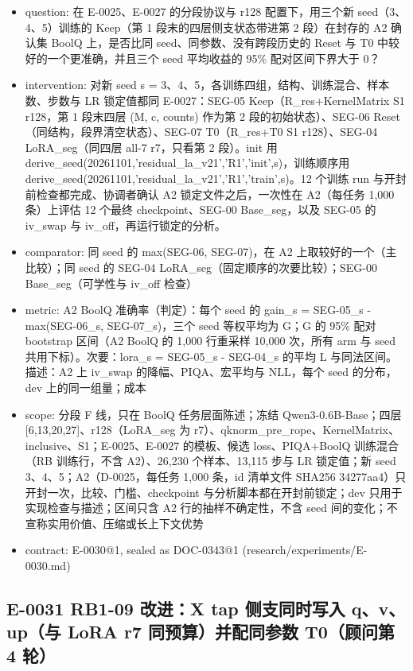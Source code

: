 \documentclass[11pt]{article}
\begin{document}
\begin{itemize}
\item question: 在 E-0025、E-0027 的分段协议与 r128 配置下，用三个新 seed（3、4、5）训练的 Keep（第 1 段末的四层侧支状态带进第 2 段）在封存的 A2 确认集 BoolQ 上，是否比同 seed、同参数、没有跨段历史的 Reset 与 T0 中较好的一个更准确，并且三个 seed 平均收益的 95\% 配对区间下界大于 0？
\item intervention: 对新 seed s = 3、4、5，各训练四组，结构、训练混合、样本数、步数与 LR 锁定值都同 E-0027：SEG-05 Keep（R\_res+KernelMatrix S1 r128，第 1 段末四层 (M, c, counts) 作为第 2 段的初始状态）、SEG-06 Reset（同结构，段界清空状态）、SEG-07 T0（R\_res+T0 S1 r128）、SEG-04 LoRA\_seg（同四层 all-7 r7，只看第 2 段）。init 用 derive\_seed(20261101,'residual\_la\_v21','R1','init',s)，训练顺序用 derive\_seed(20261101,'residual\_la\_v21','R1','train',s)。12 个训练 run 与开封前检查都完成、协调者确认 A2 锁定文件之后，一次性在 A2（每任务 1,000 条）上评估 12 个最终 checkpoint、SEG-00 Base\_seg，以及 SEG-05 的 iv\_swap 与 iv\_off，再运行锁定的分析。
\item comparator: 同 seed 的 max(SEG-06, SEG-07)，在 A2 上取较好的一个（主比较）；同 seed 的 SEG-04 LoRA\_seg（固定顺序的次要比较）；SEG-00 Base\_seg（可学性与 iv\_off 检查）
\item metric: A2 BoolQ 准确率（判定）：每个 seed 的 gain\_s = SEG-05\_s - max(SEG-06\_s, SEG-07\_s)，三个 seed 等权平均为 G；G 的 95\% 配对 bootstrap 区间（A2 BoolQ 的 1,000 行重采样 10,000 次，所有 arm 与 seed 共用下标）。次要：lora\_s = SEG-05\_s - SEG-04\_s 的平均 L 与同法区间。描述：A2 上 iv\_swap 的降幅、PIQA、宏平均与 NLL，每个 seed 的分布，dev 上的同一组量；成本
\item scope: 分段 F 线，只在 BoolQ 任务层面陈述；冻结 Qwen3-0.6B-Base；四层 [6,13,20,27]、r128（LoRA\_seg 为 r7）、qknorm\_pre\_rope、KernelMatrix、inclusive、S1；E-0025、E-0027 的模板、候选 loss、PIQA+BoolQ 训练混合（RB 训练行，不含 A2）、26,230 个样本、13,115 步与 LR 锁定值；新 seed 3、4、5；A2（D-0025，每任务 1,000 条，id 清单文件 SHA256 34277aa4）只开封一次，比较、门槛、checkpoint 与分析脚本都在开封前锁定；dev 只用于实现检查与描述；区间只含 A2 行的抽样不确定性，不含 seed 间的变化；不宣称实用价值、压缩或长上下文优势
\item contract: E-0030@1, sealed as DOC-0343@1 (research/experiments/E-0030.md)
\end{itemize}

\subsection*{E-0031 RB1-09 改进：X tap 侧支同时写入 q、v、up（与 LoRA r7 同预算）并配同参数 T0（顾问第 4 轮）}
\end{document}
